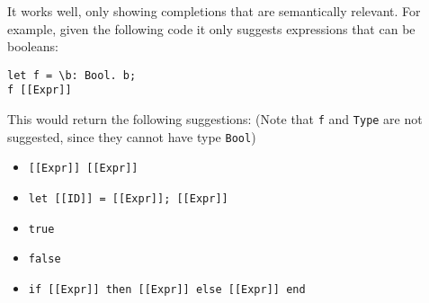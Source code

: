 It works well, only showing completions that are semantically relevant. For example, given the following code it only suggests expressions that can be booleans:
\begin{lstlisting}
let f = \b: Bool. b;
f [[Expr]]
\end{lstlisting}
This would return the following suggestions: (Note that \verb|f| and \verb|Type| are not suggested, since they cannot have type \verb|Bool|)
 \begin{itemize}
 	\item \verb|[[Expr]] [[Expr]]|
 	\item \verb|let [[ID]] = [[Expr]]; [[Expr]]|
 	\item \verb|true|
 	\item \verb|false|
 	\item \verb|if [[Expr]] then [[Expr]] else [[Expr]] end|
 \end{itemize}